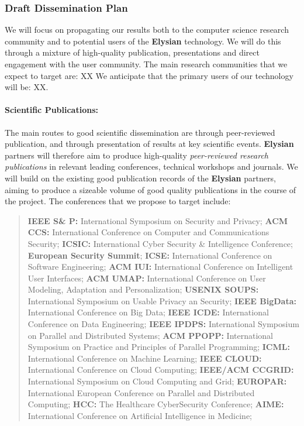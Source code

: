 \documentclass[a4paper,11pt]{article}
\newcommand{\project}[1]{\textbf{#1}\xspace}
\newcommand{\SECURITY}{\project{Elysian}}
\newcommand{\TheProject}{\SECURITY}
\begin{document}
\subsubsection{Draft Dissemination Plan}

We will focus on propagating our results both to the computer science
research community and to potential users of the \TheProject{} technology.
We will do this through a mixture of high-quality publication, presentations
and direct engagement with the user community.
%
The main research communities that we expect to target are:
XX
% 
We anticipate that the primary users of our technology will be:
XX.

\paragraph{Scientific Publications:}  The main routes to good scientific dissemination are
through peer-reviewed publication, and through presentation of results at key scientific events.
\TheProject{} partners will therefore aim to produce high-quality \emph{peer-reviewed
research publications} in relevant leading
conferences, technical workshops and journals.
We will build on the existing good publication records of the \TheProject{} partners,
aiming to produce a sizeable volume of good quality publications in the course of the project. 
%
\noindent
The conferences that we propose to target include:

\begin{quote}
\textbf{IEEE S\& P:} International Symposium on Security and Privacy;
\textbf{ACM CCS:} International Conference on Computer and Communications Security;
\textbf{ICSIC:} International Cyber Security \& Intelligence Conference;
\textbf{European Security Summit};
\textbf{ICSE:} International Conference on Software Engineering;
\textbf{ACM IUI:} International Conference on Intelligent User Interfaces;
\textbf{ACM UMAP:} International Conference on User Modeling, Adaptation and Personalization;
\textbf{USENIX SOUPS:} International Symposium on Usable Privacy an Security;
\textbf{IEEE BigData:} International Conference on Big Data;
\textbf{IEEE ICDE:} International Conference on Data Engineering;
\textbf{IEEE IPDPS:} International Symposium on Parallel and Distributed Systems;
\textbf{ACM PPOPP:} International Symposium on Practice and Principles of Parallel Programming;
\textbf{ICML:} International Conference on Machine Learning;
\textbf{IEEE CLOUD:} International Conference on Cloud Computing;
\textbf{IEEE/ACM CCGRID:} International Symposium on Cloud Computing and Grid;
\textbf{EUROPAR:} International European Conference on Parallel and Distributed Computing; 
\textbf{HCC:} The Healthcare CyberSecurity Conference;
\textbf{AIME:} International Conference on Artificial Intelligence in Medicine;
 \end{quote}
\end{document}
